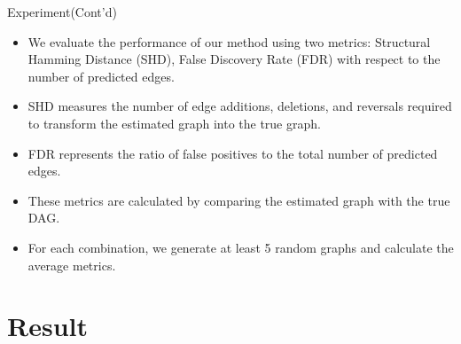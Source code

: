 \documentclass{beamer}
\begin{document}
\begin{frame}{Experiment(Cont'd)}
    \begin{itemize}
        \item We evaluate the performance of our method using two metrics: Structural Hamming Distance (SHD), False Discovery Rate (FDR) with respect to the number of predicted edges.
        \item SHD measures the number of edge additions, deletions, and reversals required to transform the estimated graph into the true graph.
        \item FDR represents the ratio of false positives to the total number of predicted edges.
        \item These metrics are calculated by comparing the estimated graph with the true DAG.
        \item For each combination, we generate at least 5 random graphs and calculate the average metrics.
    \end{itemize}
\end{frame}

\section{Result}
\end{document}
